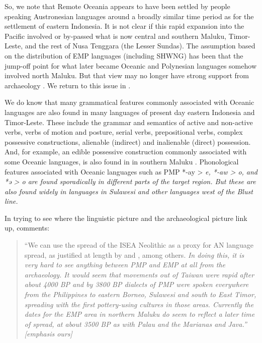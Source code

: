 So, we note that Remote Oceania appears to have been settled by people speaking Austronesian languages
around a broadly similar time period as for the settlement of eastern Indonesia.
It is not clear if this rapid expansion into the Pacific involved or by-passed what is now central
and southern Maluku, Timor-Leste,
and the rest of Nusa Tenggara (the Lesser Sundas).
The assumption based on the distribution of EMP languages (including SHWNG) has been that the jump-off
point for what later became Oceanic
and Polynesian languages somehow involved north Maluku.
But that view may no longer have strong support from archaeology \citep[4]{Bellwood2019b}.
We return to this issue in .

We do know that many grammatical features commonly associated with Oceanic languages
\citep{Pawley1973,Ross1998} are also found in many languages
of present day eastern Indonesia and Timor-Leste.
These include the grammar and semantics of active
and non-active verbs, verbs of motion
and posture, serial verbs,
prepositional verbs, complex possessive constructions, alienable (indirect)
and inalienable (direct) possession.
And, for example, an edible possessive construction commonly associated with some Oceanic languages,
is also found in  in southern Maluku \citep[47--48]{Coward2005}.
Phonological features associated with Oceanic languages such as PMP *-ay > \it{e},
*-aw > \it{o}, and *ə > \it{o} are found sporadically in different parts of the target region.
But these are also found widely in languages in Sulawesi
and other languages west of the Blust line.

In trying to see where the linguistic picture
and the archaeological picture link up,
\citet[511]{Spriggs2011} comments: 

\begin{quote}
	``We can use the spread of the ISEA Neolithic as a proxy for AN language spread,
	as justified at length by \citet{Pawley2004}
	and \citet{Ross2008}, among others.
	\it{In doing this, it is very hard to see anything between PMP
	and EMP at all from the archaeology.} It would seem that movements out of Taiwan were rapid after about
	4000 BP and by 3800 BP dialects of PMP were spoken everywhere from the Philippines to eastern Borneo,
	Sulawesi and south to East Timor,
	spreading with the first pottery-using cultures in those areas.
	Currently the dates for the EMP area in northern Maluku do seem to reflect a later time of spread,
	at about 3500 BP as with Palau
	and the Marianas and Java.'' \citep[511]{Spriggs2011}	[emphasis ours]
\end{quote}


